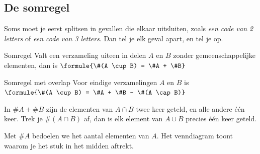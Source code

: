 \begin{oefeningen}
\end{oefeningen}

\subsection{De somregel}

Soms moet je eerst splitsen in gevallen die elkaar uitsluiten, zoals \textit{een code van 2 letters} of \textit{een code van 3 letters}. Dan tel je elk geval apart, en tel je op.

\begin{theorie}
\begin{stelling}{Somregel}
Valt een verzameling uiteen in delen $A$ en $B$ zonder gemeenschappelijke elementen, dan is \quad $\formule{\#(A \cup B) = \#A + \#B}$
\end{stelling}

\begin{stelling}{Somregel met overlap}
Voor eindige verzamelingen $A$ en $B$ is \quad $\formule{\#(A \cup B) = \#A + \#B - \#(A \cap B)}$
\end{stelling}

\begin{bewijs}
In $\#A + \#B$ zijn de elementen van $A \cap B$ twee keer geteld, en alle andere één keer. Trek je $\#(A \cap B)$ af, dan is elk element van $A \cup B$ precies één keer geteld.
\end{bewijs}
\end{theorie}

Met $\#A$ bedoelen we het aantal elementen van $A$. Het venndiagram toont waarom je het stuk in het midden aftrekt.


